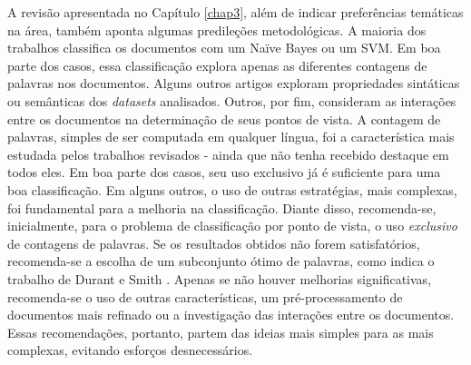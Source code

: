 A revisão apresentada no Capítulo \ref{chap3}, além de indicar preferências temáticas na área, também aponta algumas predileções metodológicas. A maioria dos trabalhos classifica os documentos com um Naïve Bayes ou um SVM. Em boa parte dos casos, essa classificação explora apenas as diferentes contagens de palavras nos documentos. Alguns outros artigos exploram propriedades sintáticas ou semânticas dos \emph{datasets} analisados. Outros, por fim, consideram as interações entre os documentos na determinação de seus pontos de vista. A contagem de palavras, simples de ser computada em qualquer língua, foi a característica mais estudada pelos trabalhos revisados - ainda que não tenha recebido destaque em todos eles. Em boa parte dos casos, seu uso exclusivo já é suficiente para uma boa classificação. Em alguns outros, o uso de outras estratégias, mais complexas, foi fundamental para a melhoria na classificação. Diante disso, recomenda-se, inicialmente, para o problema de classificação por ponto de vista, o uso \emph{exclusivo} de contagens de palavras. Se os resultados obtidos não forem satisfatórios, recomenda-se a escolha de um subconjunto ótimo de palavras, como indica o trabalho de Durant e Smith \cite{durant-smith}. Apenas se não houver melhorias significativas, recomenda-se o uso de outras características, um pré-processamento de documentos mais refinado ou a investigação das interações entre os documentos. Essas recomendações, portanto, partem das ideias mais simples para as mais complexas, evitando esforços desnecessários. 


